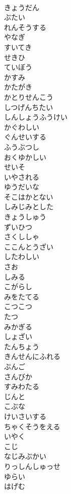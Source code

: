 \documentclass[8pt]{extreport}
\begin{document}
\begin{CJK}{UTF8}{min}
\\	きょうだん
\\	ぶたい
\\	れんそうする
\\	やなぎ
\\	すいてき
\\	せきひ
\\	ていぼう
\\	かすみ
\\	かたがき
\\	かとりせんこう
\\	しつげんちたい
\\	しんしょうふうけい
\\	かぐわしい
\\	ぐんせいする
\\	ふうぶつし
\\	おくゆかしい
\\	せいそ
\\	いやされる
\\	ゆうだいな
\\	そこはかとない
\\	しみじみとした
\\	きょうしゅう
\\	ずいひつ
\\	さくししゃ
\\	ここんとうざい
\\	したわしい
\\	さお
\\	しみる
\\	こがらし
\\	みをたてる
\\	こつこつ
\\	たつ
\\	みかぎる
\\	しょざい
\\	たんちょう
\\	きんせんにふれる
\\	ぶんご
\\	さんびか
\\	すみわたる
\\	じんと
\\	こぶな
\\	けいさいする
\\	ちゃくそうをえる
\\	いやく
\\	こじ
\\	なじみぶかい
\\	りっしんしゅっせ
\\	ゆらい
\\	はげむ

\end{CJK}
\end{document}
